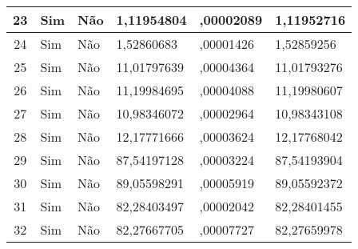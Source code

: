\documentclass[openany]{ufsctex/ufsctex}
\begin{document}
\begin{longtable}{|c|p{1cm}|p{1cm}|p{2cm}|p{2cm}|p{2cm}|}
23 & Sim & Não & 1,11954804 & ,00002089 & 1,11952716\\ \hline 
24 & Sim & Não & 1,52860683 & ,00001426 & 1,52859256\\ \hline 
25 & Sim & Não & 11,01797639 & ,00004364 & 11,01793276\\ \hline 
26 & Sim & Não & 11,19984695 & ,00004088 & 11,19980607\\ \hline 
27 & Sim & Não & 10,98346072 & ,00002964 & 10,98343108\\ \hline 
28 & Sim & Não & 12,17771666 & ,00003624 & 12,17768042\\ \hline 
29 & Sim & Não & 87,54197128 & ,00003224 & 87,54193904\\ \hline 
30 & Sim & Não & 89,05598291 & ,00005919 & 89,05592372\\ \hline 
31 & Sim & Não & 82,28403497 & ,00002042 & 82,28401455\\ \hline 
32 & Sim & Não & 82,27667705 & ,00007727 & 82,27659978\\ \hline 
 
 \end{longtable}
	
	
 
\end{document}
